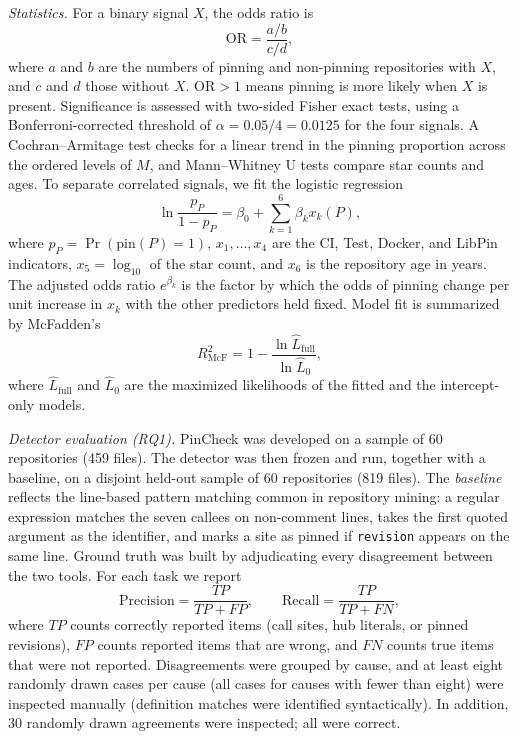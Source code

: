 \documentclass[conference]{IEEEtran}
\begin{document}
\textit{Statistics.} For a binary signal $X$, the odds ratio is
\begin{equation}
\mathrm{OR} = \frac{a/b}{c/d},
\label{eq:or}
\end{equation}
where $a$ and $b$ are the numbers of pinning and non-pinning repositories with $X$, and $c$ and $d$ those without $X$. $\mathrm{OR}>1$ means pinning is more likely when $X$ is present. Significance is assessed with two-sided Fisher exact tests, using a Bonferroni-corrected threshold of $\alpha=0.05/4=0.0125$ for the four signals. A Cochran--Armitage test checks for a linear trend in the pinning proportion across the ordered levels of $M$, and Mann--Whitney U tests compare star counts and ages. To separate correlated signals, we fit the logistic regression
\begin{equation}
\ln\frac{p_P}{1-p_P} = \beta_0 + \sum_{k=1}^{6} \beta_k x_{k}(P),
\label{eq:logit}
\end{equation}
where $p_P = \Pr(\mathrm{pin}(P)=1)$, $x_1,\dots,x_4$ are the CI, Test, Docker, and LibPin indicators, $x_5 = \log_{10}$ of the star count, and $x_6$ is the repository age in years. The adjusted odds ratio $e^{\beta_k}$ is the factor by which the odds of pinning change per unit increase in $x_k$ with the other predictors held fixed. Model fit is summarized by McFadden's
\begin{equation}
R^2_{\mathrm{McF}} = 1 - \frac{\ln \hat{L}_{\mathrm{full}}}{\ln \hat{L}_{0}},
\label{eq:r2}
\end{equation}
where $\hat{L}_{\mathrm{full}}$ and $\hat{L}_{0}$ are the maximized likelihoods of the fitted and the intercept-only models.

\textit{Detector evaluation (RQ1).} PinCheck was developed on a sample of 60 repositories (459 files). The detector was then frozen and run, together with a baseline, on a disjoint held-out sample of 60 repositories (819 files). The \emph{baseline} reflects the line-based pattern matching common in repository mining: a regular expression matches the seven callees on non-comment lines, takes the first quoted argument as the identifier, and marks a site as pinned if \texttt{revision} appears on the same line. Ground truth was built by adjudicating every disagreement between the two tools. For each task we report
\begin{equation}
\mathrm{Precision} = \frac{TP}{TP+FP}, \qquad \mathrm{Recall} = \frac{TP}{TP+FN},
\label{eq:pr}
\end{equation}
where $TP$ counts correctly reported items (call sites, hub literals, or pinned revisions), $FP$ counts reported items that are wrong, and $FN$ counts true items that were not reported. Disagreements were grouped by cause, and at least eight randomly drawn cases per cause (all cases for causes with fewer than eight) were inspected manually (definition matches were identified syntactically). In addition, 30 randomly drawn agreements were inspected; all were correct.
\end{document}
